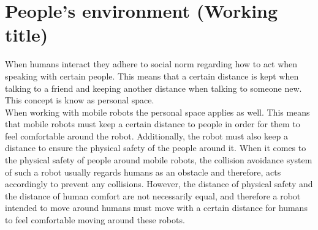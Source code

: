 \section{People's environment (Working title)}
When humans interact they adhere to social norm regarding how to act when speaking with certain people. This means that a certain distance is kept when talking to a friend and keeping another distance when talking to someone new. This concept is know as personal space.\cite{PeronalSpace}\\
\hspace*{7mm} When working with mobile robots the personal space applies as well. This means that mobile robots must keep a certain distance to people in order for them to feel comfortable around the robot. Additionally, the robot must also keep a distance to ensure the physical safety of the people around it. When it comes to the physical safety of people around mobile robots, the collision avoidance system of such a robot usually regards humans as an obstacle and therefore, acts accordingly to prevent any collisions. However, the distance of physical safety and the distance of human comfort are not necessarily equal, and therefore a robot intended to move around humans must move with a certain distance for humans to feel comfortable moving around these robots.\\